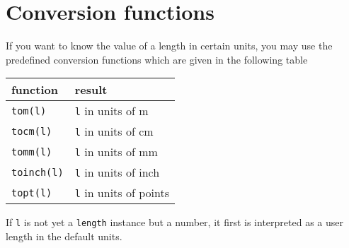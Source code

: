 \section{Conversion functions}
If you want to know the value of a \PyX{} length in certain units, you
may use the predefined conversion functions which are given in the
following table
\begin{center}
\begin{tabular}{ll}
function & result \\
\hline
\texttt{tom(l)} & \texttt{l} in units of m\\
\texttt{tocm(l)} & \texttt{l} in units of cm\\
\texttt{tomm(l)} & \texttt{l} in units of mm\\
\texttt{toinch(l)} & \texttt{l} in units of inch\\
\texttt{topt(l)} & \texttt{l} in units of points\\
\end{tabular}
\end{center}
If \verb|l| is not yet a \verb|length| instance but a number, it first
is interpreted as a user length in the default units. 



